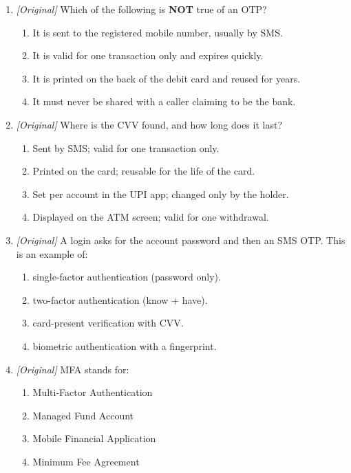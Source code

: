 \begin{enumerate}[label=\textbf{Q\arabic*.}, leftmargin=*]
\begin{enumerate}[label=\Alph*.]
    \item as a one-time code that expires after one transaction.
  \end{enumerate}
\item \textit{[Original]} Which of the following is \textbf{NOT} true of an
  OTP?
  \begin{enumerate}[label=\Alph*.]
    \item It is sent to the registered mobile number, usually by SMS.
    \item It is valid for one transaction only and expires quickly.
    \item It is printed on the back of the debit card and reused for years.
    \item It must never be shared with a caller claiming to be the bank.
  \end{enumerate}
\item \textit{[Original]} Where is the CVV found, and how long does it last?
  \begin{enumerate}[label=\Alph*.]
    \item Sent by SMS; valid for one transaction only.
    \item Printed on the card; reusable for the life of the card.
    \item Set per account in the UPI app; changed only by the holder.
    \item Displayed on the ATM screen; valid for one withdrawal.
  \end{enumerate}
\item \textit{[Original]} A login asks for the account password and then an
  SMS OTP. This is an example of:
  \begin{enumerate}[label=\Alph*.]
    \item single-factor authentication (password only).
    \item two-factor authentication (know + have).
    \item card-present verification with CVV.
    \item biometric authentication with a fingerprint.
  \end{enumerate}
\item \textit{[Original]} MFA stands for:
  \begin{enumerate}[label=\Alph*.]
    \item Multi-Factor Authentication
    \item Managed Fund Account
    \item Mobile Financial Application
    \item Minimum Fee Agreement

\end{enumerate}
\end{enumerate}
